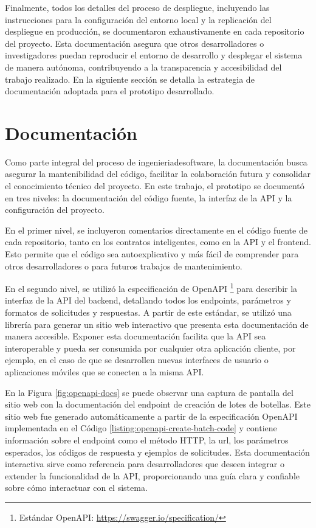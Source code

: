 Finalmente, todos los detalles del proceso de despliegue, incluyendo las instrucciones para la configuración del entorno local y la replicación del despliegue en producción, se documentaron exhaustivamente en cada repositorio del proyecto. Esta documentación asegura que otros desarrolladores o investigadores puedan reproducir el entorno de desarrollo y desplegar el sistema de manera autónoma, contribuyendo a la transparencia y accesibilidad del trabajo realizado. En la siguiente sección se detalla la estrategia de documentación adoptada para el prototipo desarrollado.

\section{Documentación}
\label{sec:documentation}

Como parte integral del proceso de \gls{ingenieriadesoftware}, la documentación busca asegurar la mantenibilidad del código, facilitar la colaboración futura y consolidar el conocimiento técnico del proyecto. En este trabajo, el prototipo se documentó en tres niveles: la documentación del código fuente, la interfaz de la API y la configuración del proyecto.

En el primer nivel, se incluyeron comentarios directamente en el código fuente de cada repositorio, tanto en los contratos inteligentes, como en la API y el \gls{frontend}. Esto permite que el código sea autoexplicativo y más fácil de comprender para otros desarrolladores o para futuros trabajos de mantenimiento. 

En el segundo nivel, se utilizó la especificación de OpenAPI \footnote{Estándar OpenAPI: \url{https://swagger.io/specification/}} para describir la interfaz de la API del \gls{backend}, detallando todos los endpoints, parámetros y formatos de solicitudes y respuestas. A partir de este estándar, se utilizó una librería para generar un sitio web interactivo que presenta esta documentación de manera accesible. Exponer esta documentación facilita que la API sea interoperable y pueda ser consumida por cualquier otra aplicación cliente, por ejemplo, en el caso de que se desarrollen nuevas interfaces de usuario o aplicaciones móviles que se conecten a la misma API. 

En la Figura \ref{fig:openapi-docs} se puede observar una captura de pantalla del sitio web con la documentación del \gls{endpoint} de creación de lotes de botellas. Este sitio web fue generado automáticamente a partir de la especificación OpenAPI implementada en el Código \ref{listing:openapi-create-batch-code} y contiene información sobre el endpoint como el método HTTP, la \gls{url}, los parámetros esperados, los códigos de respuesta y ejemplos de solicitudes. Esta documentación interactiva sirve como referencia para desarrolladores que deseen integrar o extender la funcionalidad de la API, proporcionando una guía clara y confiable sobre cómo interactuar con el sistema.

